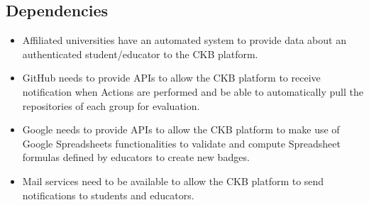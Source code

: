 \subsection{Dependencies}

\setcounter{dc}{0}
\newcommand{\cd}{\stepcounter{dc}\theac}

\newcommand{\dcrow}[1]{
    C\cd & #1 \\
    \hline
}

\begin{itemize}
    \item Affiliated universities have an automated system to provide data about an authenticated student/educator to the CKB platform.
    \item GitHub needs to provide APIs to allow the CKB platform to receive notification when Actions are performed and be able to automatically pull the repositories of each group for evaluation.
    \item Google needs to provide APIs to allow the CKB platform to make use of Google Spreadsheets functionalities to validate and compute Spreadsheet formulas defined by educators to create new badges.
    \item Mail services need to be available to allow the CKB platform to send notifications to students and educators.
\end{itemize}